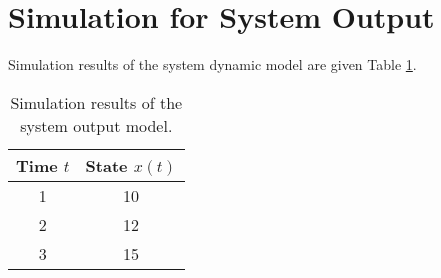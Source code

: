 \section{Simulation for System Output}

Simulation results of the system dynamic model are given Table \ref{tab:output}.

\begin{table}
 \begin{center}
  \caption{Simulation results of the system output model.}
  \label{tab:output}
  \begin{tabular}{cc}
   \hline
    Time $t$ & State $x(t)$\\
   \hline
    1 & 10 \\
    2 & 12\\
    3 & 15\\
   \hline
  \end{tabular}
 \end{center}
\end{table}
